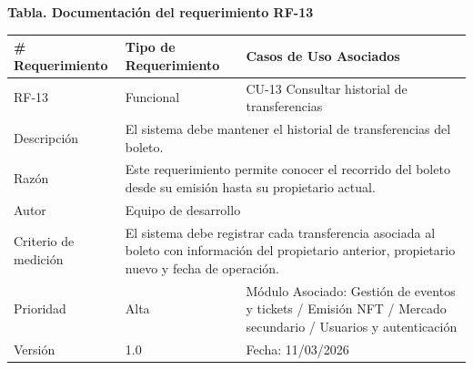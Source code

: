 \documentclass[12pt,letterpaper]{article}
\begin{document}
\noindent
\begin{minipage}{\textwidth}
\centering
\scriptsize
\renewcommand{\arraystretch}{0.9}
\setlength{\tabcolsep}{3pt}
\setlength{\arrayrulewidth}{0.5pt}

\textbf{Tabla. Documentación del requerimiento RF-13}

\vspace{2pt}

\begin{tabularx}{\textwidth}{|p{2.6cm}|X|p{3.4cm}|}
\hline
\# Requerimiento & Tipo de Requerimiento & Casos de Uso Asociados \\ \hline
RF-13 & Funcional & CU-13 Consultar historial de transferencias \\ \hline
Descripción & \multicolumn{2}{X|}{El sistema debe mantener el historial de transferencias del boleto.} \\ \hline
Razón & \multicolumn{2}{X|}{Este requerimiento permite conocer el recorrido del boleto desde su emisión hasta su propietario actual.} \\ \hline
Autor & \multicolumn{2}{X|}{Equipo de desarrollo} \\ \hline
Criterio de medición & \multicolumn{2}{X|}{El sistema debe registrar cada transferencia asociada al boleto con información del propietario anterior, propietario nuevo y fecha de operación.} \\ \hline
Prioridad & Alta & Módulo Asociado: Gestión de eventos y tickets / Emisión NFT / Mercado secundario / Usuarios y autenticación \\ \hline
Versión & 1.0 & Fecha: 11/03/2026 \\ \hline
\end{tabularx}
\end{minipage}

\vspace{0.2cm}
\end{document}
